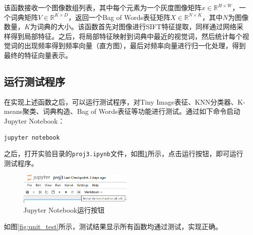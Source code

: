 该函数接收一个图像数组列表，其中每个元素为一个灰度图像矩阵$x\in\mathbb{R}^{H\times W}$，一个词典矩阵$V\in\mathbb{R}^{K\times D}$，返回一个Bag of Words表征矩阵$X\in\mathbb{R}^{N\times K}$，其中$N$为图像数量，$K$为词典的大小。该函数首先对图像进行SIFT特征提取，同样通过网络采样得到局部特征。之后，将局部特征映射到词典中最近的视觉词，然后统计每个视觉词的出现频率得到频率向量（直方图），最后对频率向量进行归一化处理，得到最终的特征向量表示。

\subsection{运行测试程序}

在实现上述函数之后，可以运行测试程序，对Tiny Image表征、KNN分类器、K-means聚类、词典构造、Bag of Words表征等功能进行测试。通过如下命令启动Jupyter Notebook：

\begin{lstlisting}[style=Bash]
jupyter notebook
\end{lstlisting}

之后，打开实验目录的\texttt{proj3.ipynb}文件，如图\ref{fig:jupyter}所示，点击运行按钮，即可运行测试程序。

\begin{figure}[H]
    \centering
    \includegraphics[width=0.5\textwidth]{pics/jupyter.png}
    \caption{Jupyter Notebook运行按钮}
    \label{fig:jupyter}
\end{figure}

如图\ref{fig:unit_test}所示，测试结果显示所有函数均通过测试，实现正确。

